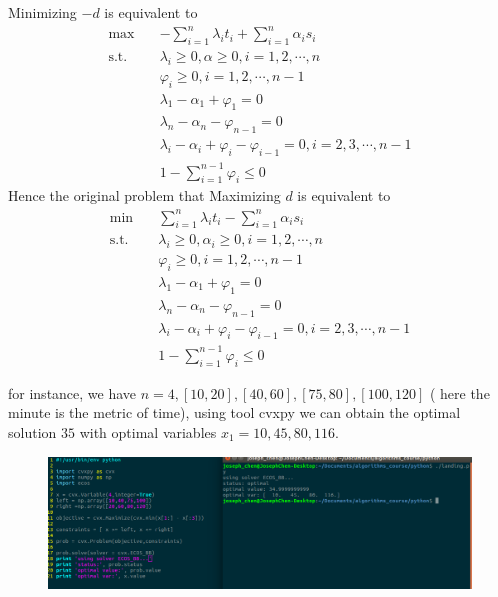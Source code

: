  Minimizing $-d$ is equivalent to 
 \[
	 \begin{split} 
	 \max \quad &- \sum_{i=1}^{n}\lambda_i t_i + \sum_{i=1}^{n} \alpha_i s_i \\
	 \text{s.t.} \quad&  \lambda_i \geq 0, \alpha \geq 0, i = 1,2,\cdots, n \\
	 &\varphi_i \geq 0, i = 1,2,\cdots, n-1\\
	  &\lambda_1 - \alpha_1 + \varphi_1 = 0 \\
	  &\lambda_n - \alpha_n -\varphi_{n-1} = 0\\
	  & \lambda_i - \alpha_i + \varphi_i - \varphi_{i-1} = 0, i = 2,3,\cdots,n-1\\
	  &1 - \sum_{i=1}^{n-1} \varphi_i \leq 0
	 \end{split} 
 \]
 Hence the original problem that Maximizing $d$ is equivalent to
 \[
 \begin{split} 
 \min \quad & \sum_{i=1}^{n}\lambda_i t_i - \sum_{i=1}^{n} \alpha_i s_i \\
 \text{s.t.} \quad&  \lambda_i \geq 0, \alpha_i \geq 0, i = 1,2,\cdots, n \\
 &\varphi_i \geq 0, i = 1,2,\cdots, n-1\\
 &\lambda_1 - \alpha_1 + \varphi_1 = 0 \\
 &\lambda_n - \alpha_n -\varphi_{n-1} = 0\\
 & \lambda_i - \alpha_i + \varphi_i - \varphi_{i-1} = 0, i = 2,3,\cdots,n-1\\
 &1 - \sum_{i=1}^{n-1} \varphi_i \leq 0
 \end{split} 
 \]
 
 
 for instance, we have $n = 4, [10,20],[40,60],[75,80],[100,120]$ ( here the minute is the metric of time),
 using tool cvxpy we can obtain the optimal solution $35$ with optimal variables $x_1 = 10, 45,80,116$.
 \begin{figure}[H]
 	\centering
 	\includegraphics[width=.8\textwidth]{work4/landing}
 \end{figure}
